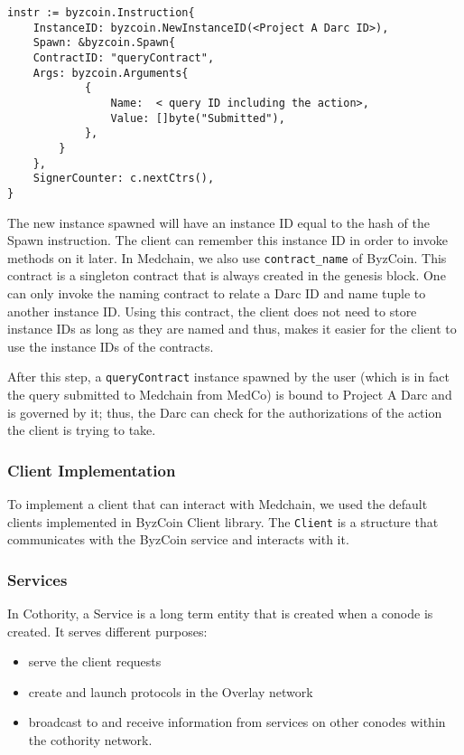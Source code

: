 \begin{verbatim}
instr := byzcoin.Instruction{
    InstanceID: byzcoin.NewInstanceID(<Project A Darc ID>),
    Spawn: &byzcoin.Spawn{
    ContractID: "queryContract",
    Args: byzcoin.Arguments{
		    {
		        Name:  < query ID including the action>,
		        Value: []byte("Submitted"), 
		    },
        }  
    },
    SignerCounter: c.nextCtrs(),
}
\end{verbatim}

The new instance spawned will have an instance ID equal to the hash of the Spawn instruction. The client can remember this instance ID in order to invoke methods on it later. In Medchain, we also use \texttt{contract\_name} of ByzCoin. This contract is a singleton contract that is always created in the genesis block. One can only invoke the naming contract to relate a Darc ID and name tuple to another instance ID. Using this contract, the client does not need to store instance IDs as long as they are named and thus, makes it easier for the client to use the instance IDs of the contracts.

After this step, a \texttt{queryContract} instance spawned by the user (which is in fact the query submitted to Medchain from MedCo) is bound to Project A Darc and is governed by it; thus, the Darc can check for the authorizations of the action the client is trying to take. 

\subsubsection{Client Implementation} \label{impl:client}
To implement a client that can interact with Medchain, we used the default clients  implemented in ByzCoin Client library. The \texttt{Client} is a structure that communicates with the ByzCoin service and interacts with it. 

\subsubsection{Services} \label{impl:services}
In Cothority, a Service is a long term entity that is created when a conode is created. It serves different purposes:
\begin{itemize}
    \item serve the client requests
    \item create and launch protocols in the Overlay network
    \item broadcast to and receive information from services on other conodes within the cothority network. 
\end{itemize}

